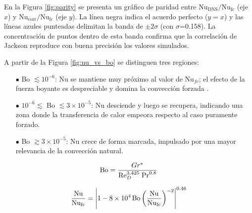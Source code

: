 En la Figura \ref{fig:parity} se presenta un gráfico de paridad entre $\text{Nu}_{\text{DNS}}/\text{Nu}_{\text{fc}}$ (eje $x$) y $\text{Nu}_{\text{corr}}/\text{Nu}_{\text{fc}}$ (eje $y$). La línea negra indica el acuerdo perfecto ($y=x$) y las líneas azules punteadas delimitan la banda de $\pm2\sigma$ (con $\sigma$=0.158). La concentración de puntos dentro de esta banda confirma que la correlación de Jackson reproduce con buena precisión los valores simulados.

A partir de la Figura \ref{fig:nu_vs_bo} se distinguen tres regiones:

\begin{itemize}
  \item[$\bullet$] Bo $\lesssim 10^{-6}$: Nu se mantiene muy próximo al valor de Nu$_{fc}$; el efecto de la fuerza boyante es despreciable y domina la convección forzada  \cite{li2021development}.
  \item[$\bullet$] $10^{-6} \lesssim$ Bo $\lesssim 3 \times 10^{-5}$: Nu desciende y luego se recupera, indicando una zona donde la transferencia de calor empeora respecto al caso puramente forzado.
  \item[$\bullet$] Bo $\gtrsim 3 \times 10^{-5}$: Nu crece de forma marcada, impulsado por una mayor relevancia de la convección natural.
\end{itemize}

\begin{equation}
\text{Bo}= \frac{Gr^*}{\text{Re}_D^{3\text{.}425} \hspace*{1mm} \text{Pr}^{0\text{.}8}}
\label{eq:jackson_bo}
\end{equation}

\begin{equation}
\frac{\text{Nu}}{\text{Nu}_{\text{fc}}} =
\left\vert 1 - 8 \times 10^4 \hspace*{0.5mm} \text{Bo}
\left( \frac{\text{Nu}}{\text{Nu}_{\text{fc}}} \right)^{-2} \right\vert^{0\text{.}46}
\label{eq:jackson_corr}
\end{equation}

\newpage

